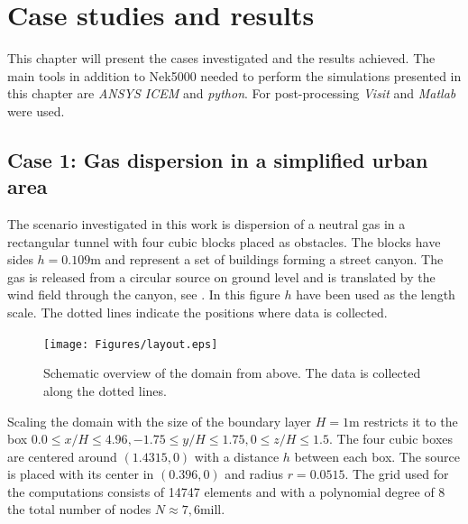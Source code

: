 
\chapter{Case studies and results} %

\label{results} %



This chapter will present the cases investigated and the results achieved.
The main tools in addition to Nek5000 needed to perform the simulations presented in this 
chapter are \textit{ANSYS ICEM} and \textit{python}. For post-processing \textit{Visit} and
\textit{Matlab} were used.
%
\section{Case 1: Gas dispersion in a simplified urban area}
The scenario investigated in this work is dispersion of a neutral gas in a rectangular tunnel
with four cubic blocks placed as obstacles. The blocks have sides $h = 0.109$m and represent a 
set of buildings forming a street canyon. The gas is released from a circular source on 
ground level and
is translated by the wind field through the canyon, see .
In this figure $h$ have been used as the length scale. The dotted lines
indicate the positions where data is collected.
%
\begin{figure}[h]
	\texttt{[image: Figures/layout.eps]}
	\caption{Schematic overview of the domain from above. The data is collected along the dotted lines.}
	\label{fig:layout}
\end{figure}
%

Scaling the domain with the size of the boundary layer $H =1$m restricts it to
the box $0.0\leq x/H \leq 4.96,-1.75\leq y/H \leq 1.75, 0\leq z/H \leq 1.5$.
The four cubic boxes are centered around $(1.4315,0)$ with a distance $h$ between each box.
The source is placed with its center in $(0.396,0)$ and radius $r = 0.0515$.
The grid used for the computations consists of 14747 elements and with a polynomial degree of
8 the total number of nodes $N\approx 7,6$mill. 


